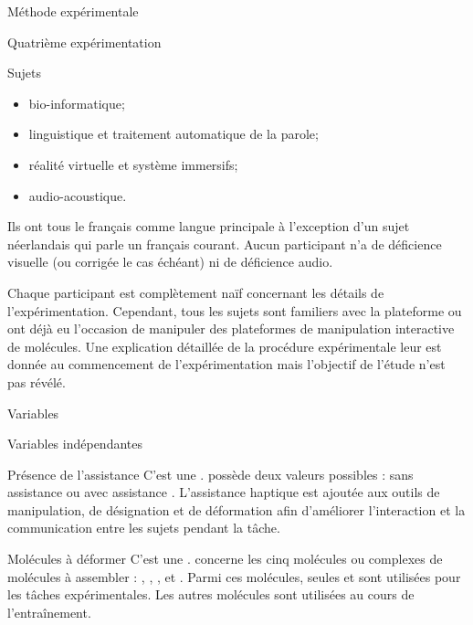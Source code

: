 \documentclass[myfrancais,ngerman,english,frenchb]{mythesis}
\begin{document}
\begin{mychapter}{Méthode expérimentale}
\begin{mysection}{Quatrième expérimentation}
\begin{mysubsection}{Sujets}
				\begin{itemize}
					\item bio-informatique;
					\item linguistique et traitement automatique de la parole;
					\item réalité virtuelle et système immersifs;
					\item audio-acoustique.
				\end{itemize}
				Ils ont tous le français comme langue principale à l'exception d'un sujet néerlandais qui parle un français courant.
				Aucun participant n'a de déficience visuelle (ou corrigée le cas échéant) ni de déficience audio.

				Chaque participant est complètement naïf concernant les détails de l'expérimentation.
				Cependant, tous les sujets sont familiers avec la plateforme \myShaddock ou ont déjà eu l'occasion de manipuler des plateformes de manipulation interactive de molécules.
				Une explication détaillée de la procédure expérimentale leur est donnée au commencement de l'expérimentation mais l'objectif de l'étude n'est pas révélé.
			\end{mysubsection}
			\begin{mysubsection}{Variables}
				\begin{mysubsubsection}{Variables indépendantes}
					\begin{myparagraph}{ Présence de l'assistance}
						C'est une .
						 possède deux valeurs possibles : \og sans assistance \fg ou \og avec assistance \fg.
						L'assistance haptique est ajoutée aux outils de manipulation, de désignation et de déformation afin d'améliorer l'interaction et la communication entre les sujets pendant la tâche.
					\end{myparagraph}
					\begin{myparagraph}{ Molécules à déformer}
						C'est une \myglos{glo-VariableIntraSujets}.
						 concerne les cinq molécules ou complexes de molécules à assembler : \og \myTRPCAGE \fg, \og \myPrion \fg, \og \myUbiquitin \fg, \og \myTRPZIPPER \fg et \og \myNusENusG \fg.
						Parmi ces molécules, seules \myUbiquitin et \myNusENusG sont utilisées pour les tâches expérimentales.
						Les autres molécules sont  utilisées au cours de l'entraînement.
					\end{myparagraph}
				\end{mysubsubsection}

\end{mysubsection}
\end{mysection}
\end{mychapter}
\end{document}
